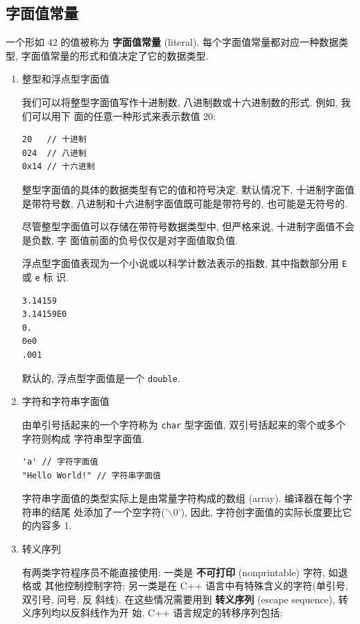 \documentclass[lang=cn]{elegantbook}
\begin{document}
\subsection{字面值常量}
\label{sec:orga4d57ad}

一个形如 42 的值被称为 \textbf{字面值常量} (literal). 每个字面值常量都对应一种数据类型,
字面值常量的形式和值决定了它的数据类型.

\begin{enumerate}
\item 整型和浮点型字面值
\label{sec:org02de6a2}

我们可以将整型字面值写作十进制数, 八进制数或十六进制数的形式. 例如, 我们可以用下
面的任意一种形式来表示数值 20:

\begin{verbatim}
20   // 十进制
024  // 八进制
0x14 // 十六进制
\end{verbatim}

整型字面值的具体的数据类型有它的值和符号决定. 默认情况下, 十进制字面值是带符号数,
八进制和十六进制字面值既可能是带符号的, 也可能是无符号的.

尽管整型字面值可以存储在带符号数据类型中, 但严格来说, 十进制字面值不会是负数, 字
面值前面的负号仅仅是对字面值取负值.

\vspace*{1\baselineskip}
浮点型字面值表现为一个小说或以科学计数法表示的指数, 其中指数部分用 \texttt{E} 或 \texttt{e} 标
识.

\begin{verbatim}
3.14159
3.14159E0
0.
0e0
.001
\end{verbatim}

默认的, 浮点型字面值是一个 \texttt{double}.

\item 字符和字符串字面值
\label{sec:org52eeb6f}

由单引号括起来的一个字符称为 \texttt{char} 型字面值, 双引号括起来的零个或多个字符则构成
字符串型字面值.

\begin{verbatim}
'a' // 字符字面值
"Hello World!" // 字符串字面值
\end{verbatim}

字符串字面值的类型实际上是由常量字符构成的数组 (array). 编译器在每个字符串的结尾
处添加了一个空字符('$\backslash$0'), 因此, 字符创字面值的实际长度要比它的内容多 1.

\item 转义序列
\label{sec:org8e8a84b}

有两类字符程序员不能直接使用: 一类是 \textbf{不可打印} (nonprintable) 字符, 如退格或
其他控制控制字符; 另一类是在 C++ 语言中有特殊含义的字符(单引号, 双引号, 问号, 反
斜线). 在这些情况需要用到 \textbf{转义序列} (escape sequence), 转义序列均以反斜线作为开
始. C++ 语言规定的转移序列包括:


\end{enumerate}
\end{document}
